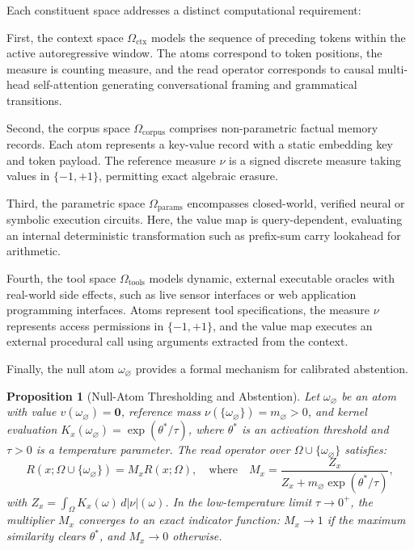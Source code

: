 \documentclass[preprint,12pt]{elsarticle}
\newtheorem{proposition}{Proposition}
\begin{document}
Each constituent space addresses a distinct computational requirement:

First, the context space $\Omega_{\mathrm{ctx}}$ models the sequence of preceding tokens within the active autoregressive window. The atoms correspond to token positions, the measure is counting measure, and the read operator corresponds to causal multi-head self-attention generating conversational framing and grammatical transitions.

Second, the corpus space $\Omega_{\mathrm{corpus}}$ comprises non-parametric factual memory records. Each atom represents a key-value record with a static embedding key and token payload. The reference measure $\nu$ is a signed discrete measure taking values in $\{-1, +1\}$, permitting exact algebraic erasure.

Third, the parametric space $\Omega_{\mathrm{params}}$ encompasses closed-world, verified neural or symbolic execution circuits. Here, the value map is query-dependent, evaluating an internal deterministic transformation such as prefix-sum carry lookahead for arithmetic.

Fourth, the tool space $\Omega_{\mathrm{tools}}$ models dynamic, external executable oracles with real-world side effects, such as live sensor interfaces or web application programming interfaces. Atoms represent tool specifications, the measure $\nu$ represents access permissions in $\{-1, +1\}$, and the value map executes an external procedural call using arguments extracted from the context.

Finally, the null atom $\omega_\varnothing$ provides a formal mechanism for calibrated abstention.

\begin{proposition}[Null-Atom Thresholding and Abstention]
Let $\omega_\varnothing$ be an atom with value $v(\omega_\varnothing) = \mathbf{0}$, reference mass $\nu(\{\omega_\varnothing\}) = m_\varnothing > 0$, and kernel evaluation $K_x(\omega_\varnothing) = \exp(\theta^* / \tau)$, where $\theta^*$ is an activation threshold and $\tau > 0$ is a temperature parameter. The read operator over $\Omega \cup \{\omega_\varnothing\}$ satisfies:
\begin{equation}
R(x; \Omega \cup \{\omega_\varnothing\}) = M_x R(x; \Omega), \quad \text{where} \quad M_x = \frac{Z_x}{Z_x + m_\varnothing \exp(\theta^* / \tau)},
\end{equation}
with $Z_x = \int_\Omega K_x(\omega) \, d|\nu|(\omega)$. In the low-temperature limit $\tau \to 0^+$, the multiplier $M_x$ converges to an exact indicator function: $M_x \to 1$ if the maximum similarity clears $\theta^*$, and $M_x \to 0$ otherwise.
\label{prop:null_atom}
\end{proposition}
\end{document}
